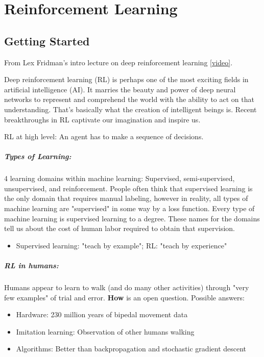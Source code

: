 \chapter{Reinforcement Learning}

\section{Getting Started}

From Lex Fridman's intro lecture on deep reinforcement learning \href{}{[video]}.

Deep reinforcement learning (RL) is perhaps one of the most exciting fields in artificial intelligence (AI). It marries the beauty and power of deep neural networks to represent and comprehend the world with the ability to act on that understanding. That's basically what the creation of intelligent beings is. Recent breakthroughs in RL captivate our imagination and inspire us.  

RL at high level: An agent has to make a sequence of decisions. 

\paragraph*{Types of Learning:}
4 learning domains within machine learning: Supervised, semi-supervised, unsupervised, and reinforcement. People often think that supervised learning is the only domain that requires manual labeling, however in reality, all types of machine learning are "supervised" in some way by a loss function. Every type of machine learning is supervised learning to a degree. These names for the domains tell us about the cost of human labor required to obtain that supervision.
\begin{itemize}
	\item Supervised learning: "teach by example"; RL: "teach by experience"
\end{itemize}

\paragraph*{RL in humans: }
Humans appear to learn to walk (and do many other activities) through "very few examples" of trial and error. \textbf{How} is an open question. Possible answers: 
\begin{itemize}
	\item Hardware: 230 million years of bipedal movement data
	\item Imitation learning: Observation of other humans walking
	\item Algorithms: Better than backpropagation and stochastic gradient descent
\end{itemize}

